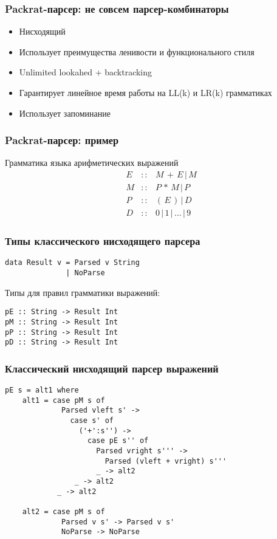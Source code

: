 \documentclass{beamer}
\begin{document}
\begin{frame}[fragile]
  \transwipe[direction=90]
  \frametitle{Packrat-парсер: не совсем парсер-комбинаторы}
  \begin{itemize}
    \item Нисходящий
    \item Использует преимущества ленивости и функционального стиля
    \item Unlimited lookahed + backtracking 
    \item Гарантирует линейное время работы на LL(k) и LR(k) грамматиках
    \item Использует запоминание
  \end{itemize}
\end{frame}
         
\begin{frame}[fragile]
  \transwipe[direction=90]
  \frametitle{Packrat-парсер: пример}
Грамматика языка арифметических выражений
$$
\begin{array}{crcl}
&E & :: & M \, + \, E \, | \, M \\ 
&M & :: & P \, * \, M \, | \, P \\ 
&P & :: & ( \, E \, ) \, | \, D \\
&D & :: & 0 \, | \, 1 \, | \, \dots \, | \, 9
\end{array}
$$   	                         
\end{frame}


\begin{frame}[fragile]
  \transwipe[direction=90]
  \frametitle{Типы классического нисходящего парсера}
\begin{verbatim}  
data Result v = Parsed v String
              | NoParse
\end{verbatim}

Типы для правил грамматики выражений:

\begin{verbatim}
pE :: String -> Result Int
pM :: String -> Result Int
pP :: String -> Result Int
pD :: String -> Result Int
\end{verbatim}

\end{frame}

\begin{frame}[fragile]
  \transwipe[direction=90]
  \frametitle{Классический нисходящий парсер выражений}
\begin{verbatim}  
pE s = alt1 where
    alt1 = case pM s of
             Parsed vleft s' ->
               case s' of
                 ('+':s'') ->
                   case pE s'' of
                     Parsed vright s''' ->
                       Parsed (vleft + vright) s'''
                     _ -> alt2
                _ -> alt2
            _ -> alt2

    alt2 = case pM s of
             Parsed v s' -> Parsed v s'
             NoParse -> NoParse
\end{verbatim}
\end{frame}
\end{document}
